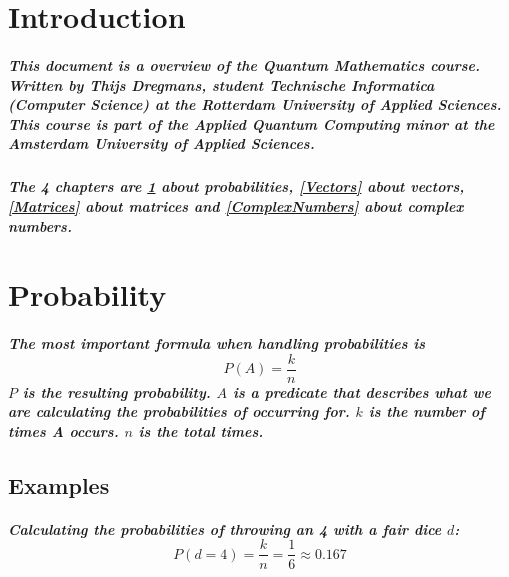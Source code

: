 \documentclass[11pt]{report}
\begin{document}
	\maketitle
	
	\chapter*{Introduction}

    \paragraph{
    This document is a overview of the Quantum Mathematics course. Written by Thijs Dregmans, student Technische Informatica (Computer Science) at the Rotterdam University of Applied Sciences. This course is part of the Applied Quantum Computing minor at the Amsterdam University of Applied Sciences.
    }

    \paragraph{
    The 4 chapters are \ref{Probability} about probabilities, \ref{Vectors} about vectors, \ref{Matrices} about matrices and \ref{ComplexNumbers} about complex numbers.
    }
	
    \chapter{Probability}\label{Probability}

    \paragraph{
    The most important formula when handling probabilities is \[P(A) = \frac{k}{n}\] \(P\) is the resulting probability. \(A\) is a predicate that describes what we are calculating the probabilities of occurring for. \(k\) is the number of times A occurs. \(n\) is the total times.
    }

    \section*{Examples}

    \paragraph{
    Calculating the probabilities of throwing an 4 with a fair dice \(d\): \[P({d=4}) = \frac{k}{n} = \frac{1}{6} \approx 0.167\]
    }
\end{document}
